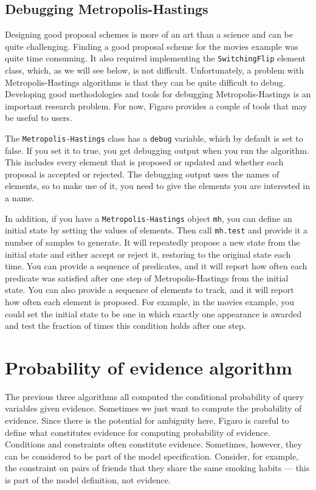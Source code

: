 \subsection{Debugging Metropolis-Hastings}

Designing good proposal schemes is more of an art than a science and can be quite challenging. Finding a good proposal scheme for the movies example was quite time consuming. It also required implementing the \texttt{SwitchingFlip} element class, which, as we will see below, is not difficult. Unfortunately, a problem with Metropolis-Hastings algorithms is that they can be quite difficult to debug. Developing good methodologies and tools for debugging Metropolis-Hastings is an important research problem. For now, Figaro provides a couple of tools that may be useful to users.

The \texttt{Metropolis-Hastings} class has a \texttt{debug} variable, which by default is set to false. If you set it to true, you get debugging output when you run the algorithm. This includes every element that is proposed or updated and whether each proposal is accepted or rejected. The debugging output uses the names of elements, so to make use of it, you need to give the elements you are interested in a name. 

In addition, if you have a \texttt{Metropolis-Hastings} object \texttt{mh}, you can define an initial state by setting the values of elements. Then call \texttt{mh.test} and provide it a number of samples to generate. It will repeatedly propose a new state from the initial state and either accept or reject it, restoring to the original state each time. You can provide a sequence of predicates, and it will report how often each predicate was satisfied after one step of Metropolis-Hastings from the initial state. You can also provide a sequence of elements to track, and it will report how often each element is proposed. For example, in the movies example, you could set the initial state to be one in which exactly one appearance is awarded and test the fraction of times this condition holds after one step.

\section{Probability of evidence algorithm}

The previous three algorithms all computed the conditional probability of query variables given evidence. Sometimes we just want to compute the probability of evidence. Since there is the potential for ambiguity here, Figaro is careful to define what constitutes evidence for computing probability of evidence. Conditions and constraints often constitute evidence. Sometimes, however, they can be considered to be part of the model specification. Consider, for example, the constraint on pairs of friends that they share the same smoking habits — this is part of the model definition, not evidence.

